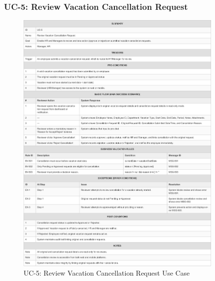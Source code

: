 \documentclass[12pt,a4paper]{article}
\begin{document}
\subsubsection{UC-5: Review Vacation Cancellation Request}
\begin{figure}[H]
\centering
\includegraphics[width=0.9\textwidth]{Use-Cases/UC-5-Review-Vacation-Cancellation-Request/UC-5-Review-Vacation-Cancellation-Request-1.png}
\caption{UC-5: Review Vacation Cancellation Request Use Case}
\label{fig:uc5}
\end{figure}
\end{document}
